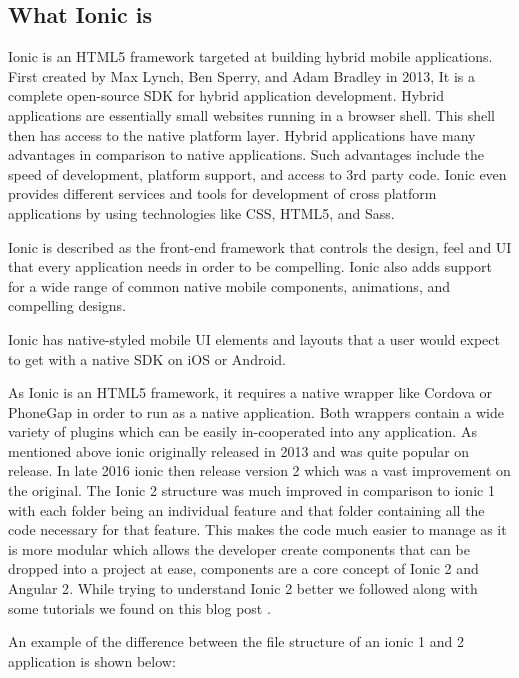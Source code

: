 \subsection{ What Ionic is }
Ionic is an HTML5 framework targeted at building hybrid mobile applications. First created by Max Lynch, Ben Sperry, and Adam Bradley in 2013, It is a complete open-source SDK for hybrid application development. Hybrid applications are essentially small websites running in a browser shell. This shell then has access to the native platform layer. Hybrid applications have many advantages in comparison to native applications. Such advantages include the speed of development, platform support, and access to 3rd party code. Ionic even provides different services and tools for development of cross platform applications by using technologies like CSS, HTML5, and Sass.\cite{Ionic}

Ionic is described as the front-end framework that controls the design, feel and UI that every application needs in order to be compelling. Ionic also adds support for a wide range of common native mobile components, animations, and compelling designs.

Ionic has native-styled mobile UI elements and layouts that a user would expect to get with a native SDK on iOS or Android.

As Ionic is an HTML5 framework, it requires a native wrapper like Cordova or PhoneGap in order to run as a native application. Both wrappers contain a wide variety of plugins which can be easily in-cooperated into any application. As mentioned above ionic originally released in 2013 and was quite popular on release. In late 2016 ionic then release version 2 which was a vast improvement on the original. The Ionic 2 structure was much improved in comparison to ionic 1 with each folder being an individual feature and that folder containing all the code necessary for that feature. This makes the code much easier to manage as it is more modular which allows the developer create components that can be dropped into a project at ease, components are a core concept of Ionic 2 and Angular 2\cite{ionic1vs2}. While trying to understand Ionic 2 better we followed along with some tutorials we found on this blog post \cite{joshmorony}.

An example of the difference between the file structure of an ionic 1 and 2 application is shown below:

